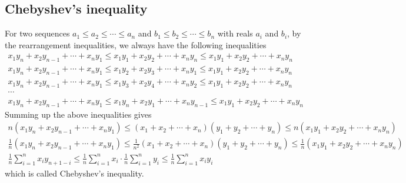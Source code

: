 \documentclass{article}
\theoremstyle{remark}
\begin{document}
\subsection{Chebyshev's inequality}
For two sequences $a_1\le a_2\le \cdots\le a_n$ and $b_1\le b_2\le \cdots\le b_n$ with reals $a_i$ and $b_i$, by the rearrangement inequalities, we always have the following inequalities
\begin{gather*}
x_1y_n+x_2y_{n-1}+\cdots+x_ny_1\le x_1y_1+x_2y_2+\cdots+x_ny_n\le x_1y_1+x_2y_2+\cdots+x_ny_n\\
x_1y_n+x_2y_{n-1}+\cdots+x_ny_1\le x_1y_2+x_2y_3+\cdots+x_ny_1\le x_1y_1+x_2y_2+\cdots+x_ny_n\\
x_1y_n+x_2y_{n-1}+\cdots+x_ny_1\le x_1y_3+x_2y_4+\cdots+x_ny_2\le x_1y_1+x_2y_2+\cdots+x_ny_n\\
\cdots\\
x_1y_n+x_2y_{n-1}+\cdots+x_ny_1\le x_1y_n+x_2y_1+\cdots+x_ny_{n-1}\le x_1y_1+x_2y_2+\cdots+x_ny_n
\end{gather*}
Summing up the above inequalities gives
\begin{gather*}
n(x_1y_n+x_2y_{n-1}+\cdots+x_ny_1)\le (x_1+x_2+\cdots+x_n)(y_1+y_2+\cdots+y_n)\le n(x_1y_1+x_2y_2+\cdots+x_ny_n)\\
\frac{1}{n}(x_1y_n+x_2y_{n-1}+\cdots+x_ny_1)\le\frac{1}{n^2} (x_1+x_2+\cdots+x_n)(y_1+y_2+\cdots+y_n)\le \frac{1}{n}(x_1y_1+x_2y_2+\cdots+x_ny_n)\\
\frac{1}{n}\sum_{i=1}^{n}x_iy_{n+1-i}\le \frac{1}{n}\sum_{i=1}^{n}x_i\cdot\frac{1}{n}\sum_{i=1}^{n}y_i\le \frac{1}{n}\sum_{i=1}^{n}x_iy_i
\end{gather*}
which is called Chebyshev's inequality.
\end{document}

